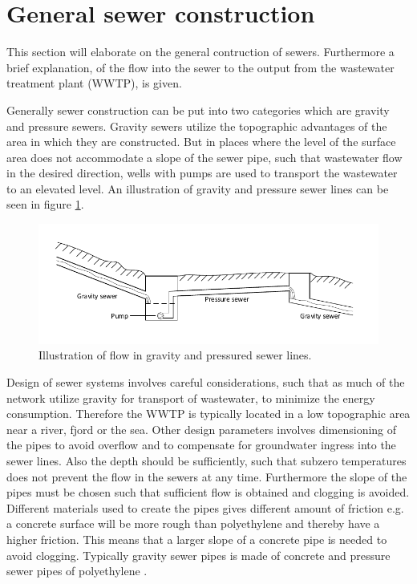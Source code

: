 \section{General sewer construction}\label{se:sewer_construction}
This section will elaborate on the general contruction of sewers. Furthermore a brief explanation, of the flow into the sewer to the output from the wastewater treatment plant (WWTP), is given.


Generally sewer construction can be put into two categories which are gravity and pressure sewers. Gravity sewers utilize the topographic advantages of the area in which they are constructed. But in places where the level of the surface area does not accommodate a slope of the sewer pipe, such that wastewater flow in the desired direction, wells with pumps are used to transport the wastewater to an elevated level. An illustration of gravity and pressure sewer lines can be seen in figure \ref{fig:Sewer_drawing}. 

\begin{figure}[H]
\centering
\includegraphics[width=1\textwidth]{report/introduction/pictures/Sewer_drawing.pdf}
\caption{Illustration of flow in gravity and pressured sewer lines.}
\label{fig:Sewer_drawing}
\end{figure}

Design of sewer systems involves careful considerations, such that as much of the network utilize gravity for transport of wastewater, to minimize the energy consumption. Therefore the WWTP is typically located in a low topographic area near a river, fjord or the sea. Other design parameters involves dimensioning of the pipes to avoid overflow and to compensate for groundwater ingress into the sewer lines.
Also the depth should be sufficiently, such that subzero temperatures does not prevent the flow in the sewers at any time. Furthermore the slope of the pipes must be chosen such that sufficient flow is obtained and clogging is avoided. Different materials used to create the pipes gives different amount of friction e.g. a concrete surface will be more rough than polyethylene and thereby have a higher friction. This means that a larger slope of a concrete pipe is needed to avoid clogging. Typically gravity sewer pipes is made of concrete and pressure sewer pipes of polyethylene \cite{Sewer_processes}.

